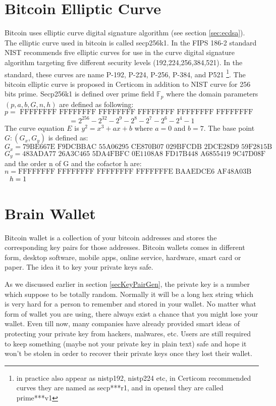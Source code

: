 \section{Bitcoin Elliptic Curve} \label{sec:secp256k1}
Bitcoin uses elliptic curve digital signature algorithm (see section \ref{sec:ecdsa}). The elliptic curve used in bitcoin is called secp256k1. In the FIPS 186-2 standard \cite{fips2000186} NIST recommends five elliptic curves for use in the curve digital signature algorithm targeting five different security levels (192,224,256,384,521). In the standard, these curves are name P-192, P-224, P-256, P-384, and P521 \footnote{in practice also appear as nistp192, nistp224 etc, in Certicom recommended curves they are named as secp***r1, and in openssl they are called prime***v1}. The bitcoin elliptic curve is proposed in Certicom \cite{certicom2000sec} in addition to NIST curve for 256 bits prime. Secp256k1 is defined over prime field $\mathbb{F}_p$ where the domain parameters $(p,a,b,G,n,h)$ are defined as following:
$$p= \text{ FFFFFFFF FFFFFFFF FFFFFFFF FFFFFFFF FFFFFFFF FFFFFFFF FFFFFFFE FFFFFC2F}$$
$$= 2^{256} - 2^{32} - 2^9 - 2^8 - 2^7 - 2^6 - 2^4 - 1$$
The curve equation $E$ is $y^2 = x^3 + ax +b $ where $a = 0$ and $b = 7$. The base point $G:(G_x,G_y)$ is defined as:
$$G_x = \text{79BE667E F9DCBBAC 55A06295 CE870B07 029BFCDB 2DCE28D9 59F2815B 16F81798}$$
$$G_y = \text{483ADA77 26A3C465 5DA4FBFC 0E1108A8 FD17B448 A6855419 9C47D08F FB10D4B8}$$
and the order n of G and the cofactor h are:
$$ n = \text{FFFFFFFF FFFFFFFF FFFFFFFF FFFFFFFE BAAEDCE6 AF48A03B BFD25E8C D0364141}$$
$ \text{\space\space }h = 1 $

\section{Brain Wallet} \label{sec:brainWallet}
Bitcoin wallet is a collection of your bitcoin addresses and stores the corresponding key pairs for those addresses. Bitcoin wallets comes in different form, desktop software, mobile apps, online service, hardware, smart card or paper. The idea it to key your private keys safe. 

As we discussed earlier in section \ref{secKeyPairGen}, the private key is a number which suppose to be totally random. Normally it will be a long hex string which is very hard for a person to remember and stored in your wallet. No matter what form of wallet you are using, there always exist a chance that you might lose your wallet. Even till now, many companies have already provided smart ideas of protecting your private key from hackers, malwares, etc. Users are still required to keep something (maybe not your private key in plain text) safe and hope it won't be stolen in order to recover their private keys once they lost their wallet.    

